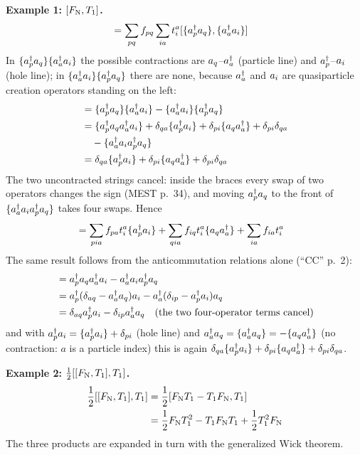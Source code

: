 \textbf{Example 1: $[F_{\mathrm{N}}, T_1]$.}
\begin{align*}
[\FN, T_1] &= \sum_{pq} f_{pq} \sum_{ia} t_i^a [\no{\cre{p} \ann{q}}, \no{\cre{a} \ann{i}}]
\end{align*}
In $\{a^{\dagger}_{p} a_{q}\} \{a^{\dagger}_{a} a_{i}\}$ the possible contractions are $a_{q}$--$a^{\dagger}_{a}$ (particle line) and $a^{\dagger}_{p}$--$a_{i}$ (hole line); in $\{a^{\dagger}_{a} a_{i}\} \{a^{\dagger}_{p} a_{q}\}$ there are none, because $a^{\dagger}_{a}$ and $a_{i}$ are quasiparticle creation operators standing on the left:
\begin{align*}
[\no{\cre{p} \ann{q}}, \no{\cre{a} \ann{i}}] &= \no{\cre{p} \ann{q}} \no{\cre{a} \ann{i}} - \no{\cre{a} \ann{i}} \no{\cre{p} \ann{q}} \\
&= \no{\cre{p} \ann{q} \cre{a} \ann{i}} + \delta_{qa} \no{\cre{p} \ann{i}} + \delta_{pi} \no{\ann{q} \cre{a}} + \delta_{pi} \delta_{qa} \\
&\quad - \no{\cre{a} \ann{i} \cre{p} \ann{q}} \\
&= \delta_{qa} \no{\cre{p} \ann{i}} + \delta_{pi} \no{\ann{q} \cre{a}} + \delta_{pi} \delta_{qa}
\end{align*}
The two uncontracted strings cancel: inside the braces every swap of two operators changes the sign (MEST p.~34), and moving $a^{\dagger}_{p} a_{q}$ to the front of $\{a^{\dagger}_{a} a_{i} a^{\dagger}_{p} a_{q}\}$ takes four swaps. Hence
\begin{align}
[\FN, T_1] &= \sum_{pia} f_{pa} t_i^a \no{\cre{p} \ann{i}} + \sum_{qia} f_{iq} t_i^a \no{\ann{q} \cre{a}} + \sum_{ia} f_{ia} t_i^a \label{eq:cc-fnt1}
\end{align}
The same result follows from the anticommutation relations alone (“CC” p.~2):
\begin{align*}
[\cre{p} \ann{q}, \cre{a} \ann{i}] &= \cre{p} \ann{q} \cre{a} \ann{i} - \cre{a} \ann{i} \cre{p} \ann{q} \\
&= \cre{p} (\delta_{aq} - \cre{a} \ann{q}) \ann{i} - \cre{a} (\delta_{ip} - \cre{p} \ann{i}) \ann{q} \\
&= \delta_{aq} \cre{p} \ann{i} - \delta_{ip} \cre{a} \ann{q} \eqnote{the two four-operator terms cancel}
\end{align*}
and with $a^{\dagger}_{p} a_{i} = \{a^{\dagger}_{p} a_{i}\} + \delta_{pi}$ (hole line) and $a^{\dagger}_{a} a_{q} = \{a^{\dagger}_{a} a_{q}\} = -\{a_{q} a^{\dagger}_{a}\}$ (no contraction: $a$ is a particle index) this is again $\delta_{qa} \{a^{\dagger}_{p} a_{i}\} + \delta_{pi} \{a_{q} a^{\dagger}_{a}\} + \delta_{pi} \delta_{qa}$.

\textbf{Example 2: $\frac{1}{2} [[F_{\mathrm{N}}, T_1], T_1]$.}
\begin{align*}
\frac{1}{2} [[F_{\mathrm{N}}, T_1], T_1] &= \frac{1}{2} [F_{\mathrm{N}} T_1 - T_1 F_{\mathrm{N}}, T_1] \\
&= \frac{1}{2} F_{\mathrm{N}} T_1^2 - T_1 F_{\mathrm{N}} T_1 + \frac{1}{2} T_1^2 F_{\mathrm{N}}
\end{align*}
The three products are expanded in turn with the generalized Wick theorem.

